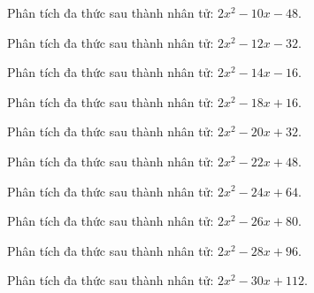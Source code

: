 \begin{bt}
	Phân tích đa thức sau thành nhân tử: $2 x^2 - 10 x - 48$.
\end{bt}
\begin{bt}
	Phân tích đa thức sau thành nhân tử: $2 x^2 - 12 x - 32$.
\end{bt}
\begin{bt}
	Phân tích đa thức sau thành nhân tử: $2 x^2 - 14 x - 16$.
\end{bt}
\begin{bt}
	Phân tích đa thức sau thành nhân tử: $2 x^2 - 18 x + 16$.
\end{bt}
\begin{bt}
	Phân tích đa thức sau thành nhân tử: $2 x^2 - 20 x + 32$.
\end{bt}
\begin{bt}
	Phân tích đa thức sau thành nhân tử: $2 x^2 - 22 x + 48$.
\end{bt}
\begin{bt}
	Phân tích đa thức sau thành nhân tử: $2 x^2 - 24 x + 64$.
\end{bt}
\begin{bt}
	Phân tích đa thức sau thành nhân tử: $2 x^2 - 26 x + 80$.
\end{bt}
\begin{bt}
	Phân tích đa thức sau thành nhân tử: $2 x^2 - 28 x + 96$.
\end{bt}
\begin{bt}
	Phân tích đa thức sau thành nhân tử: $2 x^2 - 30 x + 112$.
\end{bt}
